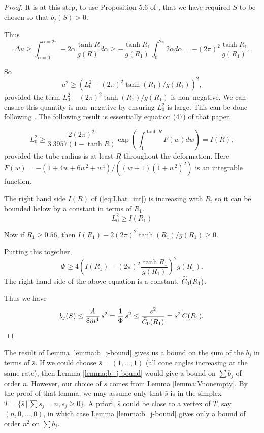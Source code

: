 \begin{proof}
It is at this step, to use Proposition 5.6 of \cite{hk:univ}, that we
have required $S$ to be chosen so that $b_j(S) > 0$.

Thus
$$\Delta u \geq \int_{\alpha=0}^{\alpha=2\pi} -2\alpha\frac{\tanh
  R}{g(R)} d\alpha \geq
-\frac{\tanh R_1}{g(R_1)}\int_{0}^{2\pi} 2\alpha d\alpha =
-(2\pi)^2\frac{\tanh R_1}{g(R_1)}.$$

So
$$u^2 \geq (L_0^2 - (2\pi)^2\tanh(R_1)/g(R_1))^2,$$
provided the term
$L_0^2 - (2\pi)^2\tanh(R_1)/g(R_1)$ is non--negative.  We can ensure
this quantity is non--negative by ensuring $L_0^2$ is large.  This can
be done following \cite{hk:univ}.  The following result is essentially
equation (47) of that paper.

\begin{equation}
L_0^2 \geq \frac{2(2\pi)^2}{3.3957(1-\tanh R)}
  \exp\left( \int_1^{\tanh R} F(w) dw\right) = I(R),
  \label{eq:Lhat_int}
\end{equation}
provided the tube radius is at least $R$ throughout the deformation.
Here $F(w) = -(1+4w+6w^2+w^4)/((w+1)(1+w^2)^2)$ is an integrable
function.

The right hand side $I(R)$ of (\ref{eq:Lhat_int}) is increasing with
$R$, so it can be bounded below by a constant in terms of $R_1$.
$$L_0^2 \geq I(R_1)$$

Now if $R_1\geq 0.56$, then 
$I(R_1) - 2(2\pi)^2\tanh(R_1)/g(R_1) \geq 0$.

Putting this together,
$$\Phi \geq 4\left(I(R_1)-(2\pi)^2\frac{\tanh R_1}{g(R_1)}\right)^2
g(R_1).$$
The right hand side of the above equation is a constant,
${\widetilde{C}}_0(R_1)$.

Thus we have
$$b_j(S) \leq \frac{A}{8m^4}\,s^2 =
  \frac{1}{\Phi}\,s^2 \leq \frac{s^2}{{\widetilde{C}}_0(R_1)} = s^2\,C(R_1).$$
\end{proof}


The result of Lemma \ref{lemma:b_j-bound} gives us a bound on the sum
of the $b_j$ in terms of $\bar{s}$.  If we could choose $\bar{s} = (1,
\dots, 1)$ (all cone angles increasing at the same rate), then Lemma
\ref{lemma:b_j-bound} would give a bound on $\sum b_j$ of order $n$.
However, our choice of $\bar{s}$ comes from Lemma
\ref{lemma:Vnonempty}.  By the proof of that lemma, we may assume only
that $\bar{s}$ is in the simplex $T=\{\bar{s}\, |\, \sum s_j=n,
s_j\geq 0\}$.  A priori, $\bar{s}$ could be close to a vertex of $T$,
say $(n, 0, \dots, 0)$, in which case Lemma \ref{lemma:b_j-bound}
gives only a bound of order $n^2$ on $\sum b_j$.

